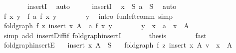 \begin{isabellebody}
\ \ \ \ \ \ \isamarkupfalse%
\ insertI\ \isamarkupfalse%
\ auto\isanewline
\ \ \ \ \isamarkupfalse%
\ insertI\ \isamarkupfalse%
\ {\isachardoublequoteopen}x\ {\isasymin}\ S{\isachardoublequoteclose}\ {\isachardoublequoteopen}a\ {\isasymin}\ S{\isachardoublequoteclose}\ \isamarkupfalse%
\ auto\isanewline
\ \ \ \ \isamarkupfalse%
\ \isamarkupfalse%
\ {\isachardoublequoteopen}f\ x\ y\ {\isacharequal}{\kern0pt}\ f\ a\ {\isacharparenleft}{\kern0pt}f\ x\ y{\isacharprime}{\kern0pt}{\isacharparenright}{\kern0pt}{\isachardoublequoteclose}\isanewline
\ \ \ \ \ \ \isamarkupfalse%
\ y\ \isamarkupfalse%
\ {\isacharparenleft}{\kern0pt}intro\ fun{\isacharunderscore}{\kern0pt}left{\isacharunderscore}{\kern0pt}comm{\isacharsemicolon}{\kern0pt}\ simp{\isacharparenright}{\kern0pt}\isanewline
\ \ \ \ \isamarkupfalse%
\ \isamarkupfalse%
\ {\isachardoublequoteopen}fold{\isacharunderscore}{\kern0pt}graph\ f\ z\ {\isacharparenleft}{\kern0pt}insert\ x\ A\ {\isacharminus}{\kern0pt}\ {\isacharbraceleft}{\kern0pt}a{\isacharbraceright}{\kern0pt}{\isacharparenright}{\kern0pt}\ {\isacharparenleft}{\kern0pt}f\ x\ y{\isacharprime}{\kern0pt}{\isacharparenright}{\kern0pt}{\isachardoublequoteclose}\isanewline
\ \ \ \ \ \ \isamarkupfalse%
\ y{\isacharprime}{\kern0pt}\ \ {\isacartoucheopen}x\ {\isasymnoteq}\ a{\isacartoucheclose}\ \ {\isacartoucheopen}x\ {\isasymnotin}\ A{\isacartoucheclose}\isanewline
\ \ \ \ \ \ \isamarkupfalse%
\ {\isacharparenleft}{\kern0pt}simp\ add{\isacharcolon}{\kern0pt}\ insert{\isacharunderscore}{\kern0pt}Diff{\isacharunderscore}{\kern0pt}if\ fold{\isacharunderscore}{\kern0pt}graph{\isachardot}{\kern0pt}insertI{\isacharparenright}{\kern0pt}\isanewline
\ \ \ \ \isamarkupfalse%
\ \isamarkupfalse%
\ {\isacharquery}{\kern0pt}thesis\isanewline
\ \ \ \ \ \ \isamarkupfalse%
\ fast\isanewline
\ \ \isamarkupfalse%
\isanewline
{}\isamarkupfalse%
%
\endisatagproof
{\isafoldproof}%
%
\isadelimproof
\isanewline
%
\endisadelimproof
\isanewline
{}\isamarkupfalse%
\ fold{\isacharunderscore}{\kern0pt}graph{\isacharunderscore}{\kern0pt}insertE{\isacharcolon}{\kern0pt}\isanewline
\ \ \ {\isachardoublequoteopen}insert\ x\ A\ {\isasymsubseteq}\ S{\isachardoublequoteclose}\isanewline
\ \ \ {\isachardoublequoteopen}fold{\isacharunderscore}{\kern0pt}graph\ f\ z\ {\isacharparenleft}{\kern0pt}insert\ x\ A{\isacharparenright}{\kern0pt}\ v{\isachardoublequoteclose}\ \ {\isachardoublequoteopen}x\ {\isasymnotin}\ A{\isachardoublequoteclose}\isanewline

\end{isabellebody}
